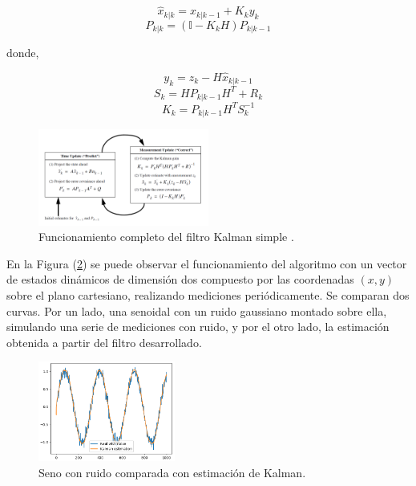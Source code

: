 \begin{equation}
\hat{x}_{k|k} = \hat{x}_{k|k-1} + K_k y_k
\end{equation}
\begin{equation}
P_{k|k} = (\mathbb{I}-K_kH)P_{k|k-1}
\end{equation}

donde,

\begin{equation}
y_k = z_k - H\hat{x}_{k|k-1}
\end{equation}
\begin{equation}
S_k = HP_{k|k-1}H^T + R_k
\end{equation}
\begin{equation}
K_k = P_{k|k-1}H^TS_k^{-1}
\end{equation}

\begin{figure}[H]
		\centering
		\includegraphics[width=0.5\textwidth]{Imagenes/kalman1.png}
		\caption{Funcionamiento completo del filtro Kalman simple \cite{ref:kalman2}.}
		\label{fig:kalman1}
\end{figure}

En la Figura (\ref{fig:kalman-comp}) se puede observar el funcionamiento del algoritmo con un vector de estados dinámicos de dimensión dos compuesto por las coordenadas $(x,y)$ sobre el plano cartesiano, realizando mediciones periódicamente. Se comparan dos curvas. Por un lado, una senoidal con un ruido gaussiano montado sobre ella, simulando una serie de mediciones con ruido, y por el otro lado, la estimación obtenida a partir del filtro desarrollado.

\begin{figure}[H]
\centering
	\includegraphics[width=0.4\textwidth]{Imagenes/Kalman_test_1.png}
	\caption{Seno con ruido comparada con estimación de Kalman.}
	\label{fig:kalman-comp}
\end{figure}

